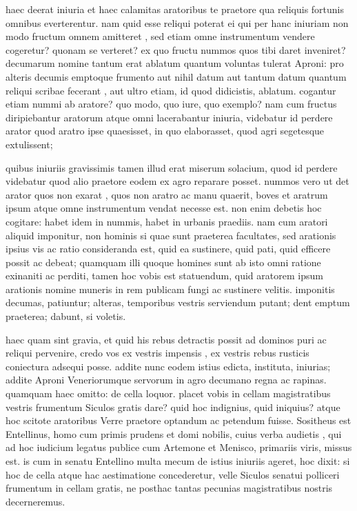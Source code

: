  haec deerat iniuria et haec calamitas aratoribus te praetore qua reliquis fortunis omnibus everterentur. nam quid esse reliqui poterat ei qui per hanc iniuriam non modo fructum omnem amitteret , sed etiam omne instrumentum vendere cogeretur? quonam se verteret? ex quo fructu nummos quos tibi daret inveniret? decumarum nomine tantum erat ablatum quantum voluntas tulerat Aproni: pro alteris decumis emptoque frumento aut nihil datum aut tantum datum quantum reliqui scribae fecerant , aut ultro etiam, id quod didicistis, ablatum. cogantur etiam nummi ab aratore? quo modo, quo iure, quo exemplo? nam cum fructus diripiebantur aratorum atque omni lacerabantur iniuria, videbatur id perdere arator quod aratro ipse quaesisset, in quo elaborasset, quod agri segetesque extulissent;

 quibus iniuriis gravissimis tamen illud erat miserum solacium, quod id perdere videbatur quod alio praetore eodem ex agro reparare posset. nummos vero ut det arator quos non exarat , quos non aratro ac manu quaerit, boves et aratrum ipsum atque omne instrumentum vendat necesse est. non enim debetis hoc cogitare: habet idem in nummis, habet in urbanis praediis. nam cum aratori aliquid imponitur, non hominis si quae sunt praeterea facultates, sed arationis ipsius vis ac ratio consideranda est, quid ea sustinere, quid pati, quid efficere possit ac debeat; quamquam illi quoque homines sunt ab isto omni ratione exinaniti ac perditi, tamen hoc vobis est statuendum, quid aratorem ipsum arationis nomine muneris in rem publicam fungi ac sustinere velitis. imponitis decumas, patiuntur; alteras, temporibus vestris serviendum putant; dent emptum praeterea; dabunt, si voletis.

 haec quam sint gravia, et quid his rebus detractis possit ad dominos puri ac reliqui pervenire, credo vos ex vestris impensis , ex vestris rebus rusticis coniectura adsequi posse. addite nunc eodem istius edicta, instituta, iniurias; addite Aproni Veneriorumque servorum in agro decumano regna ac rapinas. quamquam haec omitto: de cella loquor. placet vobis in cellam magistratibus vestris frumentum Siculos gratis dare? quid hoc indignius, quid iniquius? atque hoc scitote aratoribus Verre praetore optandum ac petendum fuisse. Sositheus est Entellinus, homo cum primis prudens et domi nobilis, cuius verba audietis , qui ad hoc iudicium legatus publice cum Artemone et Menisco, primariis viris, missus est. is cum in senatu Entellino multa mecum de istius iniuriis ageret, hoc dixit: si hoc de cella atque hac aestimatione concederetur, velle Siculos senatui polliceri frumentum in cellam gratis, ne posthac tantas pecunias magistratibus nostris decerneremus.

